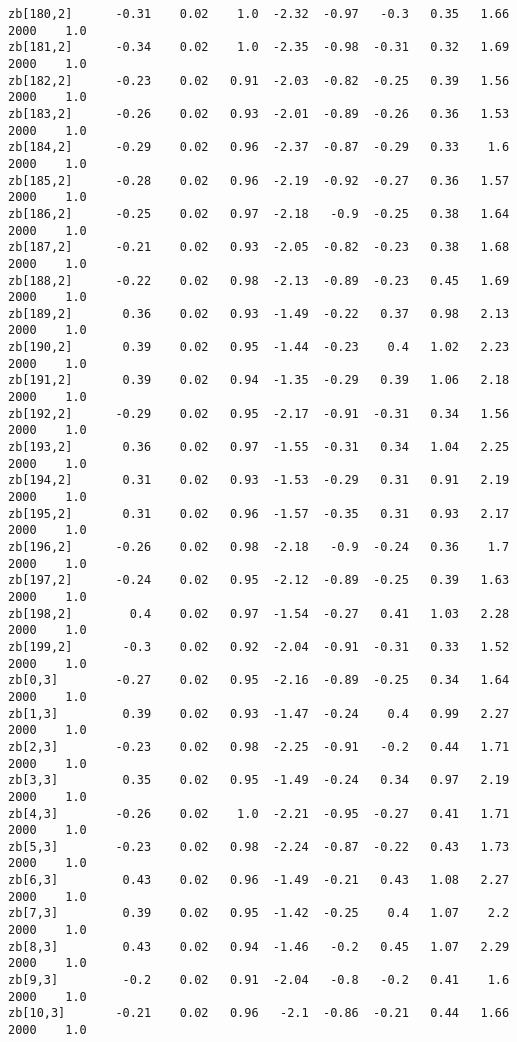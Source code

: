 \documentclass[11pt]{article}
\begin{document}
\begin{Verbatim}[commandchars=\\\{\}]
zb[180,2]      -0.31    0.02    1.0  -2.32  -0.97   -0.3   0.35   1.66   2000    1.0
zb[181,2]      -0.34    0.02    1.0  -2.35  -0.98  -0.31   0.32   1.69   2000    1.0
zb[182,2]      -0.23    0.02   0.91  -2.03  -0.82  -0.25   0.39   1.56   2000    1.0
zb[183,2]      -0.26    0.02   0.93  -2.01  -0.89  -0.26   0.36   1.53   2000    1.0
zb[184,2]      -0.29    0.02   0.96  -2.37  -0.87  -0.29   0.33    1.6   2000    1.0
zb[185,2]      -0.28    0.02   0.96  -2.19  -0.92  -0.27   0.36   1.57   2000    1.0
zb[186,2]      -0.25    0.02   0.97  -2.18   -0.9  -0.25   0.38   1.64   2000    1.0
zb[187,2]      -0.21    0.02   0.93  -2.05  -0.82  -0.23   0.38   1.68   2000    1.0
zb[188,2]      -0.22    0.02   0.98  -2.13  -0.89  -0.23   0.45   1.69   2000    1.0
zb[189,2]       0.36    0.02   0.93  -1.49  -0.22   0.37   0.98   2.13   2000    1.0
zb[190,2]       0.39    0.02   0.95  -1.44  -0.23    0.4   1.02   2.23   2000    1.0
zb[191,2]       0.39    0.02   0.94  -1.35  -0.29   0.39   1.06   2.18   2000    1.0
zb[192,2]      -0.29    0.02   0.95  -2.17  -0.91  -0.31   0.34   1.56   2000    1.0
zb[193,2]       0.36    0.02   0.97  -1.55  -0.31   0.34   1.04   2.25   2000    1.0
zb[194,2]       0.31    0.02   0.93  -1.53  -0.29   0.31   0.91   2.19   2000    1.0
zb[195,2]       0.31    0.02   0.96  -1.57  -0.35   0.31   0.93   2.17   2000    1.0
zb[196,2]      -0.26    0.02   0.98  -2.18   -0.9  -0.24   0.36    1.7   2000    1.0
zb[197,2]      -0.24    0.02   0.95  -2.12  -0.89  -0.25   0.39   1.63   2000    1.0
zb[198,2]        0.4    0.02   0.97  -1.54  -0.27   0.41   1.03   2.28   2000    1.0
zb[199,2]       -0.3    0.02   0.92  -2.04  -0.91  -0.31   0.33   1.52   2000    1.0
zb[0,3]        -0.27    0.02   0.95  -2.16  -0.89  -0.25   0.34   1.64   2000    1.0
zb[1,3]         0.39    0.02   0.93  -1.47  -0.24    0.4   0.99   2.27   2000    1.0
zb[2,3]        -0.23    0.02   0.98  -2.25  -0.91   -0.2   0.44   1.71   2000    1.0
zb[3,3]         0.35    0.02   0.95  -1.49  -0.24   0.34   0.97   2.19   2000    1.0
zb[4,3]        -0.26    0.02    1.0  -2.21  -0.95  -0.27   0.41   1.71   2000    1.0
zb[5,3]        -0.23    0.02   0.98  -2.24  -0.87  -0.22   0.43   1.73   2000    1.0
zb[6,3]         0.43    0.02   0.96  -1.49  -0.21   0.43   1.08   2.27   2000    1.0
zb[7,3]         0.39    0.02   0.95  -1.42  -0.25    0.4   1.07    2.2   2000    1.0
zb[8,3]         0.43    0.02   0.94  -1.46   -0.2   0.45   1.07   2.29   2000    1.0
zb[9,3]         -0.2    0.02   0.91  -2.04   -0.8   -0.2   0.41    1.6   2000    1.0
zb[10,3]       -0.21    0.02   0.96   -2.1  -0.86  -0.21   0.44   1.66   2000    1.0

\end{Verbatim}
\end{document}
